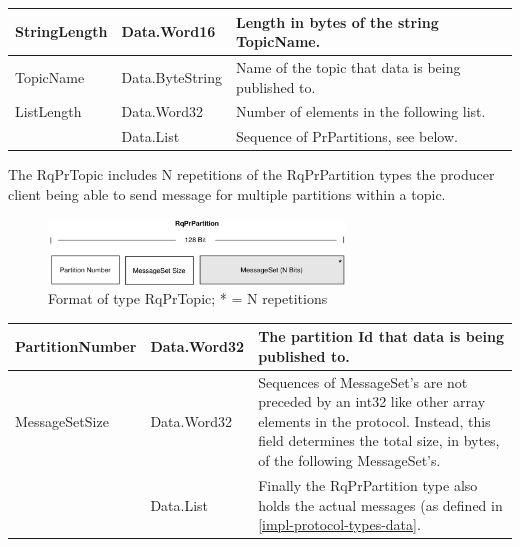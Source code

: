 \begin{table}[H]
\centering
\begin{tabular}{ l  l  p{10cm} }
\hline
StringLength      & Data.Word16     & Length in bytes of the string TopicName.              \\ \hline
TopicName         & Data.ByteString & Name of the topic that data is being published to. \\ \hline
ListLength        & Data.Word32     & Number of elements in the following list.                \\ \hline
[RqPrPartition] & Data.List          & Sequence of PrPartitions, see below.                \\ \hline
\end{tabular}
\end{table}

The RqPrTopic includes N repetitions of the RqPrPartition types
the producer client being able to send message for multiple partitions
within a topic.  

\begin{figure}[H]
    \centering
    \includegraphics[width=0.7\textwidth]{images/impl-prot-types-prPartition.png}
    \caption{Format of type RqPrTopic; * = N repetitions }
    \label{fig:impl-prot-types-produceRequest}
\end{figure}

\begin{table}[H]
\centering
\begin{tabular}{ l  l  p{11cm} }
\hline
PartitionNumber & Data.Word32 & The partition Id that data is being published to.                                                                                                                                        \\ \hline
MessageSetSize  & Data.Word32 & Sequences of MessageSet's are not preceded by an int32 like other array elements in the protocol. Instead, this field determines the total size, in bytes, of the following MessageSet's. \\ \hline
[MessageSet]      & Data.List      & Finally the RqPrPartition type also holds the actual messages (as defined in \ref{impl-protocol-types-data}.                                                                                \\ \hline
\end{tabular}
\end{table}

